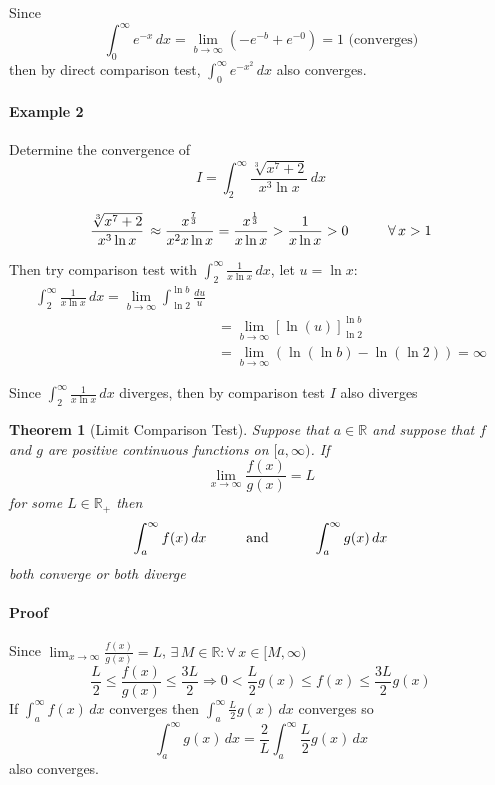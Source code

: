 \documentclass[12pt]{article}
\newcommand\tab[1][1cm]{\hspace*{#1}}
\newtheorem{theorem}{Theorem}
\begin{document}
Since
\[
    \int_0^{\infty} e^{ - x} \, dx = \lim_{b \to \infty} ( - e^{ - b} + e^{ - 0}) = 1 \textrm{  (converges)}
\]
then by direct comparison test, $\int_0^{\infty} e^{-x^2} \, dx$ also converges.

\paragraph{Example 2} Determine the convergence of 
\[
    I = \int_2^{\infty} \frac{\sqrt[3]{x^7 + 2}}{x^3 \ln x} \, dx 
\]

\[
    \frac{\sqrt[3]{x^7 + 2}}{x^3 \ln x}\, \approx \frac{x^{\frac{7}{3}}}{x^2 x \ln x} = \frac{x^{\frac{1}{3}}}{x \ln x} > \frac{1}{x \ln x} > 0 \textrm{\tab} \forall \, x > 1
\]

Then try comparison test with $\int_2^{\infty} \frac{1}{x \ln x} \, dx$, let $u = \ln x$:
\begin{align*} 
    \int_2^{\infty} \frac{1}{x \ln x} \, dx = \lim_{b \to \infty} \int_{\ln 2}^{\ln b} \frac{du}{u} \\
    &= \lim_{b \to \infty} [\ln (u)]_{\ln 2}^{\ln b} \\
    &= \lim_{b \to \infty} (\ln(\ln b) - \ln(\ln 2)) = \infty
\end{align*}

Since $\int_2^{\infty} \frac{1}{x \ln x} \, dx$ diverges, then by comparison test $I$ also diverges

\begin{theorem}[Limit Comparison Test]
     Suppose that $a \in \mathbb{R}$ and suppose that $f$ and $g$ are positive continuous functions on $[a, \infty)$. If 
     \[
         \lim_{x \to \infty} \frac{f(x)}{g(x)} = L 
     \]
     for some $L \in \mathbb{R_{+}}$ then 
     \[
         \int_a^{\infty} f(x) \, dx \textrm{\tab and \tab} \int_a^{\infty} g(x) \, dx
     \]
     both converge or both diverge
\end{theorem}

\paragraph{Proof}
Since $\lim_{x \to \infty} \frac{f(x)}{g(x)} = L$, $\exists \, M \in \mathbb{R} : \forall \, x \in [M, \infty)$
\[
    \frac{L}{2} \leq \frac{f(x)}{g(x)} \leq \frac{3L}{2} \Rightarrow 0 < \frac{L}{2} g(x) \leq f(x) \leq \frac{3L}{2} g(x)
\]
If $\int_a^{\infty} f(x) \, dx$ converges then $\int_a^{\infty} \frac{L}{2} g(x) \, dx$ converges so
\[
    \int_a^{\infty} g(x) \, dx = \frac{2}{L} \int_a^{\infty} \frac{L}{2} g(x) \, dx 
\]
also converges.
\end{document}
